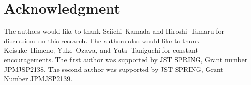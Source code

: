 \documentclass[12pt]{article}
\theoremstyle{plain}
\theoremstyle{definition}
\begin{document}
\section*{Acknowledgment}
  The authors would like to thank Seiichi~Kamada and Hiroshi~Tamaru for discussions on this research.
  The authors also would like to thank Keisuke~Himeno, Yuko~Ozawa, and Yuta~Taniguchi for constant encouragements.
  The first author was supported by JST SPRING, Grant number JPMJSP2138.
  The second author was supported by JST SPRING, Grant Number JPMJSP2139.



\end{document}

